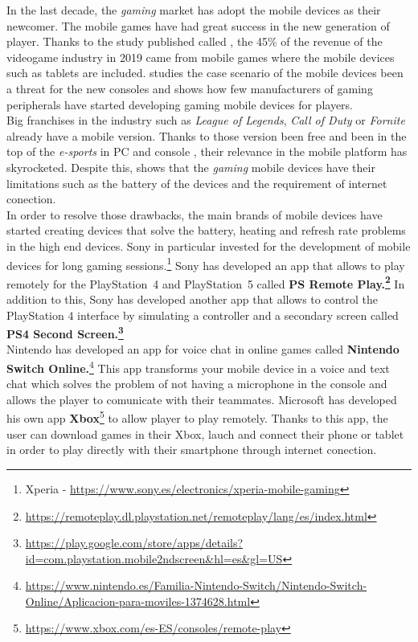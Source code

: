 In the last decade, the \textit{gaming} market has adopt the mobile devices as their newcomer. The mobile games have had great success in the new generation of player. Thanks to the study published called  \cite{AEVI2019}, the 45\% of the revenue of the videogame industry in 2019 came from mobile games where the mobile devices such as tablets are included. \cite{moviles} studies the case scenario of the mobile devices been a threat for the new consoles and shows how few manufacturers of gaming peripherals have started developing gaming mobile devices for players.\\

Big franchises in the industry such as \textit{League of Legends}, \textit{Call of Duty} or\textit{ Fornite} already have a mobile version. Thanks to those version been free and been in the top of the \textit{e-sports} in PC and console  \citep*{TEOQ32020}, their relevance in the mobile platform has skyrocketed. Despite this, \cite{futuro} shows that the \textit{gaming} mobile devices have their limitations such as the battery of the devices and the requirement of internet conection.\\

In order to resolve those drawbacks, the main brands of mobile devices have started creating devices that solve the battery, heating and refresh rate problems in the high end devices. Sony in particular invested for the development of mobile devices for long gaming sessions.\footnote{Xperia -  \url{https://www.sony.es/electronics/xperia-mobile-gaming}} Sony has developed an app that allows to play remotely for the PlayStation~4 and PlayStation~5 called \textbf{PS Remote Play.\footnote{\url{https://remoteplay.dl.playstation.net/remoteplay/lang/es/index.html}}} In addition to this, Sony has developed another app that allows to control the PlayStation 4 interface by simulating a controller and a secondary screen called \textbf{PS4 Second Screen.\footnote{\url{https://play.google.com/store/apps/details?id=com.playstation.mobile2ndscreen&hl=es&gl=US}}}\\

Nintendo has developed an app for voice chat in online games called \textbf{Nintendo Switch Online.}\footnote{\url{https://www.nintendo.es/Familia-Nintendo-Switch/Nintendo-Switch-Online/Aplicacion-para-moviles-1374628.html}} This app transforms your mobile device in a voice and text chat which solves the problem of not having a microphone in the console and allows the player to comunicate with their teammates. Microsoft has developed his own app \textbf{Xbox}\footnote{\url{https://www.xbox.com/es-ES/consoles/remote-play}} to allow player to play remotely. Thanks to this app, the user can download games in their Xbox, lauch and connect their phone or tablet in order to play directly with their smartphone through internet conection.\\

